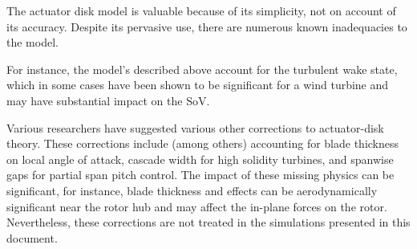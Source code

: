 
The actuator disk model is valuable because of its simplicity, not on
account of its accuracy. Despite its pervasive use, there are numerous
known inadequacies to the model. 


For instance, the model's described above account for the turbulent wake
state, which in some cases have been shown to be significant for a wind
turbine\cite{churchfield2012numerical} and may have substantial impact
on the SoV. 

Various researchers\cite{Moriarty_aerodyntheory,wilson1978design} have
suggested various other corrections to actuator-disk theory. These
corrections include (among others) accounting for blade thickness on
local angle of attack, cascade width for high solidity turbines, and
spanwise gaps for partial span pitch control. The impact of these
missing physics can be significant, for instance, blade thickness and
effects can be aerodynamically significant near the rotor hub and may 
affect the in-plane forces on the rotor. Nevertheless,
these corrections are not treated in the simulations presented in this
document. 

